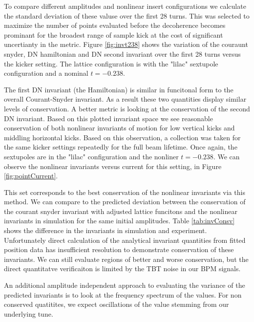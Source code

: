 To compare different amplitudes and nonlinear insert configurations we calculate the standard deviation of these valuse over the first 28 turns. This was selected to maximize the number of points evaluated before the decoherence becomes prominant for the broadest range of sample kick at the cost of significant uncertianty in the metric. Figure \ref{fig:invt238} shows the variation of the couraunt snyder, DN hamiltonian and DN second invariant over the first 28 turns versus the kicker setting. The lattice configuration is with the "lilac" sextupole configuration and a nominal $t=-0.238$.

The first DN invariant (the Hamiltonian) is similar in funcitonal form to the overall Courant-Snyder invariant. As a result these two quantities display similar levels of conservation. A better metric is looking at the conservation of the second DN invariant. Based on this plotted invariant space we see reasonable conservation of both nonlinear invariants of motion for low vertical kicks and middling horizontal kicks. Based on this observation, a collection was taken for the same kicker settings repeatedly for the full beam lifetime. Once again, the sextupoles are in the "lilac" configuration and the nonliner $t=-0.238$. We can observe the nonlinear invariants versus current for this setting, in Figure \ref{fig:pointCurrent}. 

This set corresponds to the best conservation of the nonlinear invariants via this method. We can compare to the predicted deviation between the conservation of the courant snyder invariant with adjusted lattice funcitons and the nonlinear invariants in simulation for the same initial amplitudes. Table \ref{tab:invConsv} shows the difference in the invariants in simulation and experiment. Unfortunately direct calculation of the analytical invariant quantities from fitted position data has insufficient resolution to demonstrate conservation of these invariants. We can still evaluate regions of better and worse conservation, but the direct quantitatve verificaiton is limited by the TBT noise in our BPM signals.


An additional amplitude independent approach to evaluating the variance of the predicted invariants is to look at the frequency spectrum of the values. For non conserved quatitites, we expect oscillations of the value stemming from our underlying tune.


